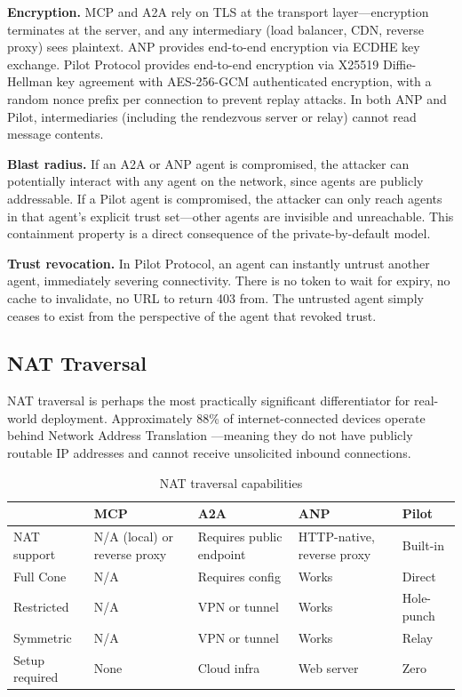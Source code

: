 \documentclass[11pt,a4paper]{article}
\begin{document}
\textbf{Encryption.} MCP and A2A rely on TLS at the transport layer---encryption terminates at the server, and any intermediary (load balancer, CDN, reverse proxy) sees plaintext. ANP provides end-to-end encryption via ECDHE key exchange. Pilot Protocol provides end-to-end encryption via X25519 Diffie-Hellman key agreement with AES-256-GCM authenticated encryption, with a random nonce prefix per connection to prevent replay attacks. In both ANP and Pilot, intermediaries (including the rendezvous server or relay) cannot read message contents.

\textbf{Blast radius.} If an A2A or ANP agent is compromised, the attacker can potentially interact with any agent on the network, since agents are publicly addressable. If a Pilot agent is compromised, the attacker can only reach agents in that agent's explicit trust set---other agents are invisible and unreachable. This containment property is a direct consequence of the private-by-default model.

\textbf{Trust revocation.} In Pilot Protocol, an agent can instantly untrust another agent, immediately severing connectivity. There is no token to wait for expiry, no cache to invalidate, no URL to return 403 from. The untrusted agent simply ceases to exist from the perspective of the agent that revoked trust.

\subsection{NAT Traversal}

NAT traversal is perhaps the most practically significant differentiator for real-world deployment. Approximately 88\% of internet-connected devices operate behind Network Address Translation \cite{nat-stats}---meaning they do not have publicly routable IP addresses and cannot receive unsolicited inbound connections.

\begin{table}[h]
\centering
\caption{NAT traversal capabilities}
\label{tab:nat}
\begin{tabular}{@{}L{2.5cm}L{2.5cm}L{2.5cm}L{2.5cm}L{2.5cm}@{}}
\toprule
& \textbf{MCP} & \textbf{A2A} & \textbf{ANP} & \textbf{Pilot} \\
\midrule
NAT support & N/A (local) or reverse proxy & Requires public endpoint & HTTP-native, reverse proxy & Built-in \\
Full Cone & N/A & Requires config & Works & Direct \\
Restricted & N/A & VPN or tunnel & Works & Hole-punch \\
Symmetric & N/A & VPN or tunnel & Works & Relay \\
Setup required & None & Cloud infra & Web server & Zero \\
\bottomrule
\end{tabular}
\end{table}
\end{document}
